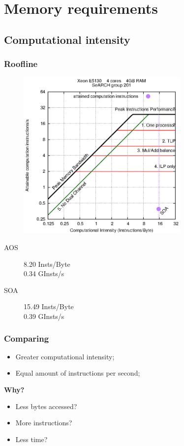 \documentclass{beamer}
\begin{document}
\section{Memory requirements}
\subsection{Computational intensity}
\begin{frame}
	\frametitle{Roofline}
	\begin{multicols}{2}
		\begin{figure}
			\begin{center}
				\includegraphics[width=0.75\textwidth]{images/roofline/201.eps}
			\end{center}
		\end{figure}
		\begin{description}
			\item[AOS]{8.20 Insts/Byte\\0.34 GInsts/s}
			\item[SOA]{15.49 Insts/Byte\\0.39 GInsts/s}
		\end{description}
	\end{multicols}
\end{frame}

\begin{frame}
	\frametitle{Comparing}
	\begin{center}
		\parbox{0.7\textwidth}{
			\begin{itemize}
				\item[]{Greater computational intensity;}
				\item[]{Equal amount of instructions per second;}
			\end{itemize}
		}
	\end{center}
	\begin{center}
		\Huge\bfseries
		Why?
	\end{center}
	\begin{itemize}
		\pause
		\item{Less bytes accessed?}
		\pause
		\item{More instructions?}
		\pause
		\item{Less time?}
	\end{itemize}
\end{frame}
\end{document}
